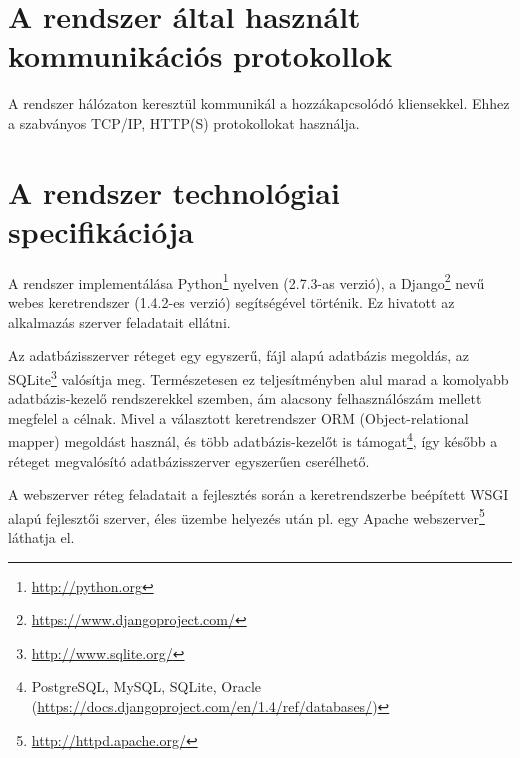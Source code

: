 \documentclass[a4paper,10pt,titlepage]{article}
\begin{document}
\section{A rendszer által használt kommunikációs protokollok}

A rendszer hálózaton keresztül kommunikál a hozzákapcsolódó kliensekkel. Ehhez a szabványos TCP/IP, HTTP(S) protokollokat használja.

\section{A rendszer technológiai specifikációja}

A rendszer implementálása Python\footnote{\url{http://python.org}} nyelven (2.7.3-as verzió), a Django\footnote{\url{https://www.djangoproject.com/}} nevű webes keretrendszer (1.4.2-es verzió) segítségével történik. Ez hivatott az alkalmazás szerver feladatait ellátni.

Az adatbázisszerver réteget egy egyszerű, fájl alapú adatbázis megoldás, az SQLite\footnote{\url{http://www.sqlite.org/}} valósítja meg. Természetesen ez teljesítményben alul marad a komolyabb adatbázis-kezelő rendszerekkel szemben, ám alacsony felhasználószám mellett megfelel a célnak. Mivel a választott keretrendszer ORM (Object-relational mapper) megoldást használ, és több adatbázis-kezelőt is támogat{\footnote{PostgreSQL, MySQL, SQLite, Oracle (\url{https://docs.djangoproject.com/en/1.4/ref/databases/})}}, így később a réteget megvalósító adatbázisszerver egyszerűen cserélhető.

A webszerver réteg feladatait a fejlesztés során a keretrendszerbe beépített WSGI alapú fejlesztői szerver, éles üzembe helyezés után pl. egy Apache webszerver\footnote{\url{http://httpd.apache.org/}} láthatja el.
\end{document}
